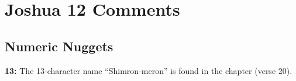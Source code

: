 \section{Joshua 12 Comments}

\subsection{Numeric Nuggets}
\textbf{13: } The 13-character name ``Shimron-meron'' is found in the chapter (verse 20).